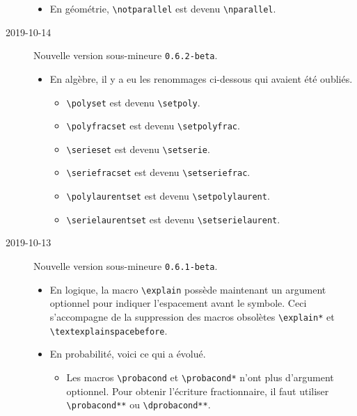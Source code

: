 \documentclass[12pt,a4paper]{article}
\newcommand\env[1]{\texttt{#1}}
\newcommand\macro[1]{\env{\textbackslash{}#1}}
\theoremstyle{definition}
\begin{document}
\begin{description}
\begin{itemize}[itemsep=.5em]
    
        \item En géométrie, \macro{notparallel} est devenu \macro{nparallel}.
    \end{itemize}


    \medskip
    \item[2019-10-14] Nouvelle version sous-mineure \verb+0.6.2-beta+.
    
    \begin{itemize}[itemsep=.5em]
        \item En algèbre, il y a eu les renommages ci-dessous qui avaient été oubliés.
        \begin{itemize}[itemsep=.5em]
            \item \macro{polyset} est devenu \macro{setpoly}.
    
            \item \macro{polyfracset} est devenu \macro{setpolyfrac}.
    
            \item \macro{serieset} est devenu \macro{setserie}.
    
            \item \macro{seriefracset} est devenu \macro{setseriefrac}.
    
            \item \macro{polylaurentset} est devenu \macro{setpolylaurent}.
    
            \item \macro{serielaurentset} est devenu \macro{setserielaurent}.
        \end{itemize}
    \end{itemize}


    \medskip
    \item[2019-10-13] Nouvelle version sous-mineure \verb+0.6.1-beta+.
    
    \begin{itemize}[itemsep=.5em]
        \item En logique, la macro \macro{explain} possède maintenant un argument optionnel pour indiquer l'espacement avant le symbole.
              Ceci s'accompagne de la suppression des macros obsolètes \macro{explain*} et \macro{textexplainspacebefore}.
    
    
        \item En probabilité, voici ce qui a évolué.
        \begin{itemize}[itemsep=.5em]
            \item Les macros \macro{probacond} et \macro{probacond*} n'ont plus d'argument optionnel. Pour obtenir l'écriture fractionnaire, il faut utiliser \macro{probacond**} ou \macro{dprobacond**}.
    

\end{itemize}
\end{itemize}
\end{description}
\end{document}
